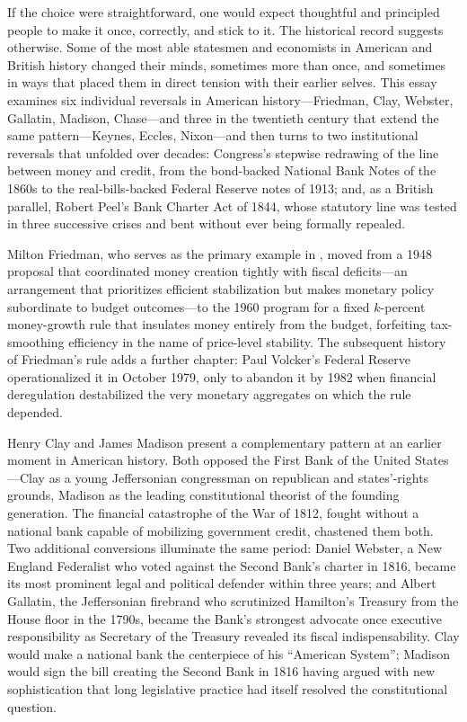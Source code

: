 \documentclass[12pt]{article}
\begin{document}
If the choice were straightforward, one would expect thoughtful and
principled people to make it once, correctly, and stick to it.  The
historical record suggests otherwise.  Some of the most able statesmen
and economists in American and British history changed their minds,
sometimes more than once, and sometimes in ways that placed them in
direct tension with their earlier selves.  This essay examines six
individual reversals in American history---Friedman, Clay, Webster,
Gallatin, Madison, Chase---and three in the twentieth century that
extend the same pattern---Keynes, Eccles, Nixon---and then turns to two
institutional reversals that unfolded over decades: Congress's stepwise
redrawing of the line between money and credit, from the bond-backed
National Bank Notes of the 1860s to the real-bills-backed Federal
Reserve notes of 1913; and, as a British parallel, Robert Peel's Bank
Charter Act of 1844, whose statutory line was tested in three successive
crises and bent without ever being formally repealed.

Milton Friedman, who serves as the primary example in \citet{Sargent2011},
moved from a 1948 proposal that coordinated money creation tightly with
fiscal deficits---an arrangement that prioritizes efficient stabilization
but makes monetary policy subordinate to budget outcomes---to the 1960
program for a fixed $k$-percent money-growth rule that insulates money
entirely from the budget, forfeiting tax-smoothing efficiency in the
name of price-level stability.  The subsequent history of Friedman's
rule adds a further chapter: Paul Volcker's Federal Reserve
operationalized it in October 1979, only to abandon it by 1982 when
financial deregulation destabilized the very monetary aggregates on
which the rule depended.

Henry Clay and James Madison present a complementary pattern at an
earlier moment in American history.  Both opposed the First Bank of the
United States---Clay as a young Jeffersonian congressman on republican
and states'-rights grounds, Madison as the leading constitutional
theorist of the founding generation.  The financial catastrophe of the
War of 1812, fought without a national bank capable of mobilizing
government credit, chastened them both.  Two additional conversions
illuminate the same period: Daniel Webster, a New England Federalist who
voted against the Second Bank's charter in 1816, became its most
prominent legal and political defender within three years; and Albert
Gallatin, the Jeffersonian firebrand who scrutinized Hamilton's Treasury
from the House floor in the 1790s, became the Bank's strongest advocate
once executive responsibility as Secretary of the Treasury revealed its
fiscal indispensability.  Clay would make a national bank
the centerpiece of his ``American System''; Madison would sign the bill
creating the Second Bank in 1816 having argued with new sophistication
that long legislative practice had itself resolved the constitutional
question.
\end{document}
